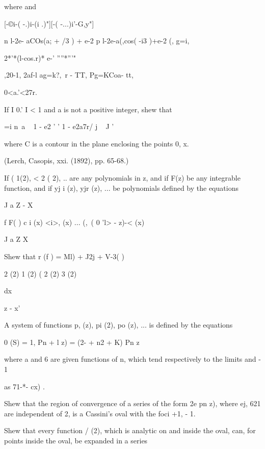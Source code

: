 \begin{wandwmiscexamples}
\begin{wandwmiscexample}
    where and

    [-©i-( -.)i-(i .)"][-( -...)i'-G,y"]

    n l-2e- aCOs(a; + /3 ) + e-2 p l-2e-a(,cos( -i3 )+e-2 (, g=i,

    2*'*(l-cos.r)* e-' ''''*'''"

    ,20-1, 2af-l ag=k?,\ r - TT, Pg=KCoa- tt,

    0<a.'<27r.

  \end{wandwmiscexample}
  \begin{wandwmiscexample}
    If I 0.' I < 1 and a is not a positive integer, shew that

    =i n~a ~ 1 - e2 ' ' 1 - e2a7r/ j ~ J '

    where C is a contour in the plane enclosing the points 0, x.

    (Lerch, Casopis, xxi. (1892), pp. 65-68.)
  \end{wandwmiscexample}
  \begin{wandwmiscexample}
    If ( 1(2), < 2 ( 2), .. are any polynomials in z, and if F(z) be
    any integrable function, and if yj i (z), yjr (z), ... be polynomials
    defined by the equations

    J a Z - X

    f F( ) c i (x) <i>, (x) ... (,\, ( 0 'l> - z)-< (x)

    J a Z X

    Shew that r (f ) = Ml) + J2j + V-3( )

    2 (2) 1 (2) ( 2 (2) 3 (2)

    dx

    z - x'
  \end{wandwmiscexample}
  \begin{wandwmiscexample}
    A system of functions p, (z), pi (2), po (z), ... is defined by
    the equations

    0 (S) = 1, Pn + l z) = (2- + n2 + K) Pn z\

    where a and 6 are given functions of n, which tend respectively to the
    limits and - 1

    as 71-*- cx) .

    Shew that the region of convergence of a series of the form 2e pn z),
    where ej, 621  are independent of 2, is a Cassini's oval with the
    foci +1, - 1.

    Shew that every function / (2), which is analytic on and inside the
    oval, can, for points inside the oval, be expanded in a series


\end{wandwmiscexample}
\end{wandwmiscexamples}
